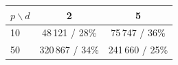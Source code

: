 \begin{tabular}{lcc}
\toprule
$p\backslash d$ & 2 & 5 \\
\midrule
10 & 48\,121 / 28\% & 75\,747 / 36\% \\
50 & 320\,867 / 34\% & 241\,660 / 25\% \\
\bottomrule
\end{tabular}
